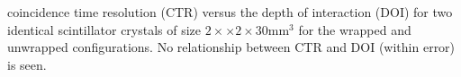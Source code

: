 \label{fig:ctrvsdoi} coincidence time resolution (CTR) versus the depth of interaction (DOI) for two identical scintillator crystals of size $2\times\times2\times30$mm$^3$ for the wrapped and unwrapped configurations. No relationship between CTR and DOI (within error) is seen.